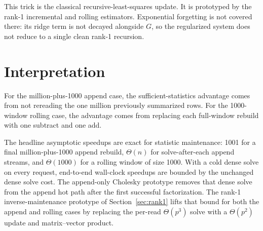 \documentclass[11pt]{article}
\begin{document}
This trick is the classical recursive-least-squares update.  It is
prototyped by the rank-1 incremental and rolling estimators.
Exponential forgetting is not covered there: its ridge term is not
decayed alongside \(G\), so the regularized system does not reduce to a
single clean rank-1 recursion.

\section{Interpretation}

For the million-plus-1000 append case, the sufficient-statistics
advantage comes from not rereading the one million previously summarized
rows.  For the 1000-window rolling case, the advantage comes from
replacing each full-window rebuild with one subtract and one add.

The headline asymptotic speedups are exact for statistic maintenance:
1001 for a final million-plus-1000 append rebuild, \(\Theta(n)\) for
solve-after-each append streams, and \(\Theta(1000)\) for a rolling
window of size 1000.  With a cold dense solve on every request,
end-to-end wall-clock speedups are bounded by the unchanged dense solve
cost.  The append-only Cholesky prototype removes that dense solve from
the append hot path after the first successful factorization.  The
rank-1 inverse-maintenance prototype of Section~\ref{sec:rank1} lifts
that bound for both the append and rolling cases by replacing the
per-read \(\Theta(p^3)\) solve with a \(\Theta(p^2)\) update and
matrix--vector product.
\end{document}
